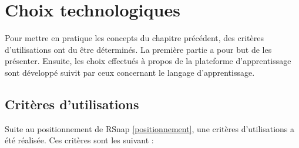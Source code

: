 \section{Choix technologiques}
\label{techno}
Pour mettre en pratique les concepts du chapitre précédent, des critères d'utilisations ont du être déterminés. La première partie a pour but de les présenter. Ensuite, les choix effectués à propos de la plateforme d'apprentissage sont développé suivit par ceux concernant le langage d'apprentissage.




\subsection{Critères d'utilisations}
Suite au positionnement de RSnap \ref{positionnement}, une critères d'utilisations a été réalisée. Ces critères sont les suivant :


